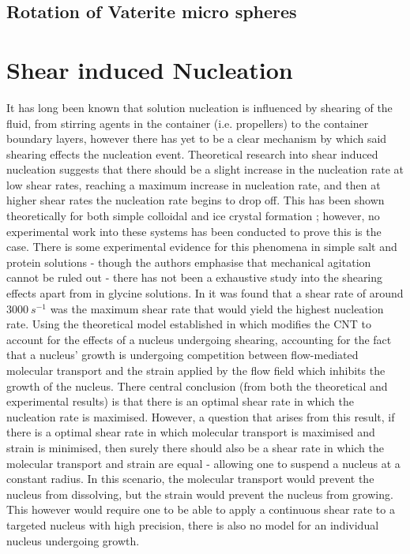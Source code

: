 \subsection{Rotation of Vaterite micro spheres}


\section{Shear induced Nucleation}

It has long been known that solution nucleation is influenced by shearing of the fluid, from stirring agents in the container (i.e. propellers) to the container boundary layers, however there has yet to be a clear mechanism by which said shearing effects the nucleation event. Theoretical research into shear induced nucleation suggests that there should be a slight increase in the nucleation rate at low shear rates, reaching a maximum increase in nucleation rate, and then at higher shear rates the nucleation rate begins to drop off. This has been shown theoretically for both simple colloidal \cite{Mura2016,Debuysschere2023,Richard2015}  and ice crystal formation \cite{Goswami2020}; however, no experimental work into these systems has been conducted to prove this is the case.  There is some experimental evidence for this phenomena in simple salt and protein solutions - though the authors emphasise that mechanical agitation cannot be ruled out - there has not been a exhaustive study into the shearing effects apart from in glycine solutions. In \cite{Debuysschere2023} it was found that a shear rate of around $3000\ s^{-1}$ was the maximum shear rate that would yield the highest nucleation rate. Using the theoretical model established in \cite{Mura2016,2001} which modifies the CNT to account for the effects of a nucleus undergoing shearing, accounting for the fact that a nucleus' growth is undergoing competition between flow-mediated molecular transport and the strain applied by the flow field which inhibits the growth of the nucleus. There central conclusion (from both the theoretical and experimental results) is that there is an optimal shear rate in which the nucleation rate is maximised. However, a question that arises from this result, if there is a optimal shear rate in which molecular transport is maximised and strain is minimised, then surely there should also be a shear rate in which the molecular transport and strain are equal - allowing one to suspend a nucleus at a constant radius. In this scenario, the molecular transport would prevent the nucleus from dissolving, but the strain would prevent the nucleus from growing. This however would require one to be able to apply a continuous shear rate to a targeted nucleus with high precision, there is also no model for an individual nucleus undergoing growth. 

